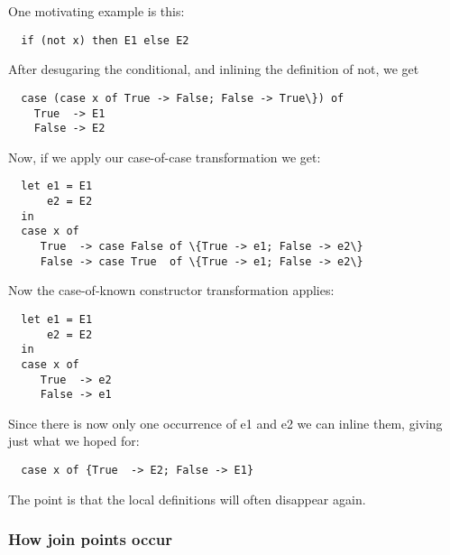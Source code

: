 \documentclass[11pt]{article}
\begin{document}
One motivating example is this:
\begin{lstlisting}
  if (not x) then E1 else E2
\end{lstlisting}
After desugaring the conditional, and inlining the definition of
not, we get
\begin{lstlisting}
  case (case x of True -> False; False -> True\}) of 
	True  -> E1
	False -> E2
\end{lstlisting}
Now, if we apply our case-of-case transformation we get:
\begin{lstlisting}
  let e1 = E1
      e2 = E2
  in
  case x of
     True  -> case False of \{True -> e1; False -> e2\}
     False -> case True  of \{True -> e1; False -> e2\}
\end{lstlisting}
Now the case-of-known constructor transformation applies:
\begin{lstlisting}
  let e1 = E1
      e2 = E2
  in
  case x of
     True  -> e2
     False -> e1
\end{lstlisting}
Since there is now only one occurrence of e1 and e2 we can
inline them, giving just what we hoped for:
\begin{lstlisting}
  case x of {True  -> E2; False -> E1}
\end{lstlisting}
The point is that the local definitions will often disappear again.

\subsubsection{How join points occur}
\end{document}

